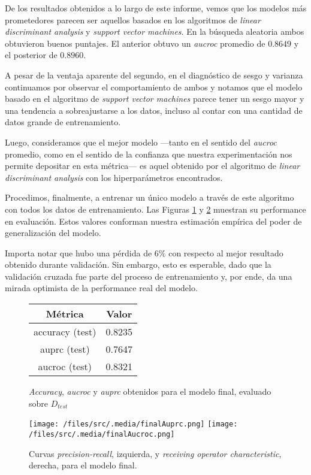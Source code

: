 De los resultados obtenidos a lo largo de este informe, vemos que los modelos más prometedores parecen ser aquellos basados en los algoritmos de \textit{linear discriminant analysis} y \textit{support vector machines}. En la búsqueda aleatoria ambos obtuvieron buenos puntajes. El anterior obtuvo un \textit{aucroc} promedio de $0.8649$ y el posterior de $0.8960$.

A pesar de la ventaja aparente del segundo, en el diagnóstico de sesgo y varianza continuamos por observar el comportamiento de ambos y notamos que el modelo basado en el algoritmo de \textit{support vector machines} parece tener un sesgo mayor y una tendencia a sobreajustarse a los datos, incluso al contar con una cantidad de datos grande de entrenamiento.

Luego, consideramos que el mejor modelo ---tanto en el sentido del \textit{aucroc} promedio, como en el sentido de la confianza que nuestra experimentación nos permite depositar en esta métrica--- es aquel obtenido por el algoritmo de \textit{linear discriminant analysis} con los hiperparámetros encontrados.  

Procedimos, finalmente, a entrenar un único modelo a través de este algoritmo con todos los datos de entrenamiento. Las Figuras \ref{metricas_final} y \ref{curvas_final} muestran su performance en evaluación. Estos valores conforman nuestra estimación empírica del poder de generalización del modelo.

Importa notar que hubo una pérdida de $6\%$ con respecto al mejor resultado obtenido durante validación. Sin embargo, esto es esperable, dado que la validación cruzada fue parte del proceso de entrenamiento y, por ende, da una mirada optimista de la performance real del modelo.

\vspace{0.5em}
\begin{figure}[!htbp]
    \begin{center}
        \begin{tabular}{ |c|c| } 
         \hline
        Métrica         & Valor \\
        \hline
        accuracy (test) &  0.8235 \\
        auprc (test)    &  0.7647 \\
        aucroc (test)   &  0.8321 \\
        \hline
        \end{tabular}
    \end{center}
    \caption{\textit{Accuracy}, \textit{aucroc} y \textit{auprc} obtenidos para el modelo final, evaluado sobre $D_{test}$} \label{metricas_final}
\end{figure}

\begin{figure}[!htbp]
    \centering 
    \texttt{[image: /files/src/.media/finalAuprc.png]}
    \texttt{[image: /files/src/.media/finalAucroc.png]}
    \caption{Curvas \textit{precision-recall}, izquierda, y \textit{receiving operator characteristic}, derecha, para el modelo final.}
    \label{curvas_final}
\end{figure}
